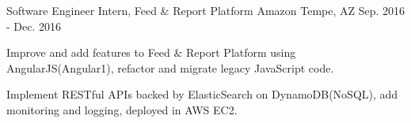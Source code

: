 \begin{cventries}
\cventry
{Software Engineer Intern, Feed \& Report Platform} %
{Amazon} %
{Tempe, AZ} %
{Sep. 2016 - Dec. 2016} %
{
\begin{cvitems}
    \item Improve and add features to Feed \& Report Platform using AngularJS(Angular1), refactor and migrate legacy JavaScript code.
    \item Implement RESTful APIs backed by ElasticSearch on DynamoDB(NoSQL), add monitoring and logging, deployed in AWS EC2.
\end{cvitems}
}



\end{cventries}